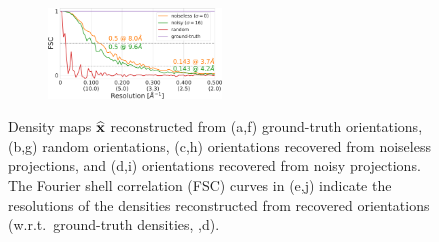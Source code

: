 \begin{figure}[t]
\begin{subfigure}[b]{0.33\linewidth}
        \centering
        \includegraphics[height=2.4cm]{figures/5a1a_quartercvg_uniformS2_noise0_FSC_apr_init_customFSC2.pdf}
        \caption{}\label{fig:5a1a-reconstruction-fsc}
    \end{subfigure}
    \caption{%
        Density maps $\widehat{\mathbf{x}}$ reconstructed from (a,f) ground-truth orientations, (b,g) random orientations, (c,h) orientations recovered from noiseless projections, and (d,i) orientations recovered from noisy projections.
        The Fourier shell correlation (FSC) curves in (e,j) indicate the resolutions of the densities reconstructed from recovered orientations (w.r.t.\ ground-truth densities,  ,d).
    }\label{fig:reconstructions}
\end{figure}




